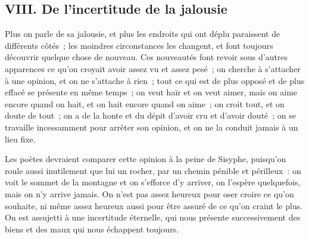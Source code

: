 \documentclass[french,twoside]{book} %
\begin{document}
\subsection[{VIII. De l’incertitude de la jalousie}]{VIII. De l’incertitude de la jalousie}
\noindent Plus on parle de sa jalousie, et plus les endroits qui ont déplu paraissent de différents côtés ; les moindres circonstances les changent, et font toujours découvrir quelque chose de nouveau. Ces nouveautés font revoir sous d’autres apparences ce qu’on croyait avoir assez vu et assez pesé ; on cherche à s’attacher à une opinion, et on ne s’attache à rien ; tout ce qui est de plus opposé et de plus effacé se présente en même temps ; on veut haïr et on veut aimer, mais on aime encore quand on hait, et on hait encore quand on aime ; on croit tout, et on doute de tout ; on a de la honte et du dépit d’avoir cru et d’avoir douté ; on se travaille incessamment pour arrêter son opinion, et on ne la conduit jamais à un lieu fixe.\par
Les poètes devraient comparer cette opinion à la peine de Sisyphe, puisqu’on roule aussi inutilement que lui un rocher, par un chemin pénible et périlleux : on voit le sommet de la montagne et on s’efforce d’y arriver, on l’espère quelquefois, mais on n’y arrive jamais. On n’est pas assez heureux pour oser croire ce qu’on souhaite, ni même assez heureux aussi pour être assuré de ce qu’on craint le plus. On est assujetti à une incertitude éternelle, qui nous présente successivement des biens et des maux qui nous échappent toujours.
\end{document}
